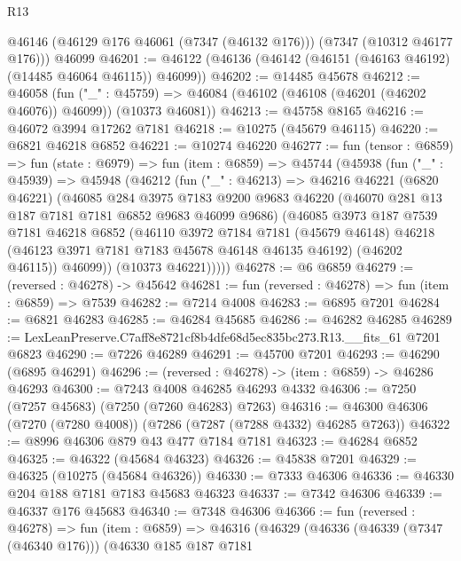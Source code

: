 \begin{lexlean}{R13}
\begin{coremodule}
      @46146
      (@46129 @176 @46061 (@7347 (@46132 @176)))
      (@7347 (@10312 @46177 @176)))
    @46099
@46201 := @46122 (@46136 (@46142 (@46151 (@46163 @46192) (@14485 @46064 @46115)) @46099))
@46202 := @14485 @45678
@46212 := @46058
    (fun ("_" : @45759) => @46084 (@46102 (@46108 (@46201 (@46202 @46076)) @46099)) (@10373 @46081))
@46213 := @45758 @8165
@46216 := @46072 @3994 @17262 @7181
@46218 := @10275 (@45679 @46115)
@46220 := @6821 @46218 @6852
@46221 := @10274 @46220
@46277 := fun (tensor : @6859) =>
  fun (state : @6979) =>
  fun (item : @6859) =>
  @45744
    (@45938
      (fun ("_" : @45939) =>
      @45948
        (@46212
          (fun ("_" : @46213) =>
          @46216
            @46221
            (@6820 @46221)
            (@46085
              @284
              @3975
              @7183
              @9200
              @9683
              @46220
              (@46070 @281 @13 @187 @7181 @7181 @6852 @9683 @46099 @9686)
              (@46085
                @3973
                @187
                @7539
                @7181
                @46218
                @6852
                (@46110
                  @3972
                  @7184
                  @7181
                  (@45679 @46148)
                  @46218
                  (@46123 @3971 @7181 @7183 @45678 @46148 @46135 @46192)
                  (@46202 @46115))
                @46099))
            (@10373 @46221)))))
@46278 := @6 @6859
@46279 := (reversed : @46278) -> @45642
@46281 := fun (reversed : @46278) => fun (item : @6859) => @7539
@46282 := @7214 @4008
@46283 := @6895 @7201
@46284 := @6821 @46283
@46285 := @46284 @45685
@46286 := @46282 @46285
@46289 := LexLeanPreserve.C7aff8e8721cf8b4dfe68d5ec835bc273.R13.__fits_61 @7201 @6823
@46290 := @7226 @46289
@46291 := @45700 @7201
@46293 := @46290 (@6895 @46291)
@46296 := (reversed : @46278) -> (item : @6859) -> @46286 @46293
@46300 := @7243 @4008 @46285 @46293 @4332
@46306 := @7250 (@7257 @45683) (@7250 (@7260 @46283) @7263)
@46316 := @46300 @46306 (@7270 (@7280 @4008)) (@7286 (@7287 (@7288 @4332) @46285 @7263))
@46322 := @8996 @46306 @879 @43 @477 @7184 @7181
@46323 := @46284 @6852
@46325 := @46322 (@45684 @46323)
@46326 := @45838 @7201
@46329 := @46325 (@10275 (@45684 @46326))
@46330 := @7333 @46306
@46336 := @46330 @204 @188 @7181 @7183 @45683 @46323
@46337 := @7342 @46306
@46339 := @46337 @176 @45683
@46340 := @7348 @46306
@46366 := fun (reversed : @46278) =>
  fun (item : @6859) =>
  @46316
    (@46329
      (@46336
        (@46339 (@7347 (@46340 @176)))
        (@46330
          @185
          @187
          @7181

\end{coremodule}
\end{lexlean}
